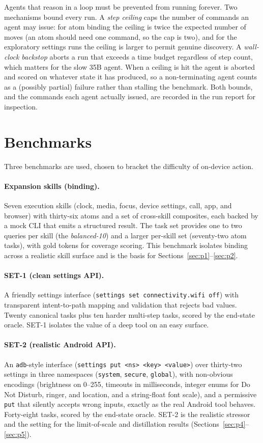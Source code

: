 Agents that reason in a loop must be prevented from running forever. Two
mechanisms bound every run. A \emph{step ceiling} caps the number of commands an
agent may issue: for atom binding the ceiling is twice the expected number of
moves (an atom should need one command, so the cap is two), and for the
exploratory settings runs the ceiling is larger to permit genuine discovery. A
\emph{wall-clock backstop} aborts a run that exceeds a time budget regardless of
step count, which matters for the slow 35B agent. When a ceiling is hit the agent
is aborted and scored on whatever state it has produced, so a non-terminating
agent counts as a (possibly partial) failure rather than stalling the benchmark.
Both bounds, and the commands each agent actually issued, are recorded in the run
report for inspection.

\section{Benchmarks}
\label{sec:m-benchmarks}

Three benchmarks are used, chosen to bracket the difficulty of on-device action.

\paragraph{Expansion skills (binding).} Seven execution skills (clock, media,
focus, device settings, call, app, and browser) with thirty-six atoms and a set
of cross-skill composites, each backed by a mock CLI that emits a structured
result. The task set provides one to two queries per skill (the
\emph{balanced-10}) and a larger per-skill set (seventy-two atom tasks), with gold
tokens for coverage scoring. This benchmark isolates binding across a realistic
skill surface and is the basis for Sections~\ref{sec:p1}--\ref{sec:p2}.

\paragraph{SET-1 (clean settings API).} A friendly settings interface
(\texttt{settings set connectivity.wifi off}) with transparent intent-to-path
mapping and validation that rejects bad values. Twenty canonical tasks plus ten
harder multi-step tasks, scored by the end-state oracle. SET-1 isolates the value
of a deep tool on an easy surface.

\paragraph{SET-2 (realistic Android API).} An \texttt{adb}-style interface
(\texttt{settings put <ns> <key> <value>}) over thirty-two settings in three
namespaces (\texttt{system}, \texttt{secure}, \texttt{global}), with non-obvious
encodings (brightness on 0--255, timeouts in milliseconds, integer enums for Do
Not Disturb, ringer, and location, and a string-float font scale), and a
permissive \texttt{put} that silently accepts wrong inputs, exactly as the real
Android tool behaves. Forty-eight tasks, scored by the end-state oracle. SET-2 is
the realistic stressor and the setting for the limit-of-scale and distillation
results (Sections~\ref{sec:p4}--\ref{sec:p5}).


